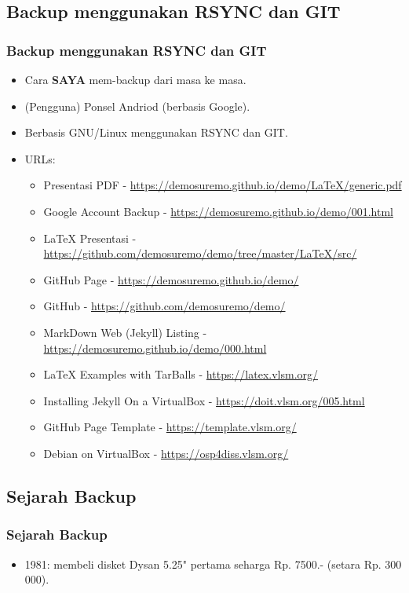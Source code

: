 \documentclass[xcolor=table, notheorems, hyperref={pdfpagelabels=false}]{beamer}
\begin{document}
\begin{frame}[fragile]
\section{Backup menggunakan RSYNC dan GIT}
\frametitle{Backup menggunakan RSYNC dan GIT}
\begin{itemize}
\item Cara \textbf{SAYA} mem-backup dari masa ke masa.
\item (Pengguna) Ponsel Andriod (berbasis Google).
\item Berbasis GNU/Linux menggunakan RSYNC dan GIT.
\item URLs:
\begin{itemize}
\item Presentasi PDF - {\scriptsize \url{https://demosuremo.github.io/demo/LaTeX/generic.pdf}}
\item Google Account Backup - {\scriptsize \url{https://demosuremo.github.io/demo/001.html}}
\item LaTeX Presentasi - {\tiny \url{https://github.com/demosuremo/demo/tree/master/LaTeX/src/}}
\item GitHub Page - \url{https://demosuremo.github.io/demo/}
\item GitHub - \url{https://github.com/demosuremo/demo/}
\item MarkDown Web (Jekyll) Listing - {\tiny \url{https://demosuremo.github.io/demo/000.html}}
\item LaTeX Examples with TarBalls - \url{https://latex.vlsm.org/}
\item Installing Jekyll On a VirtualBox  {\scriptsize - \url{https://doit.vlsm.org/005.html}}
\item GitHub Page Template - \url{https://template.vlsm.org/}
\item Debian on VirtualBox - \url{https://osp4diss.vlsm.org/}
\end{itemize}
\end{itemize}
\end{frame}

\begin{frame}[fragile]
\section{Sejarah Backup}
\frametitle{Sejarah Backup}
\begin{itemize}
\item 1981: membeli disket Dysan 5.25" pertama seharga Rp. 7500.- (setara Rp. 300 000).
\end{itemize}
\end{frame}
\end{document}
